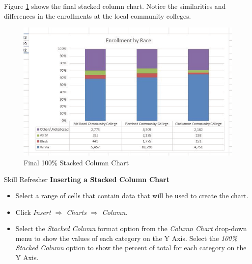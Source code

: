 Figure \ref{04:fig27} shows the final stacked column chart. Notice the similarities and differences in the enrollments at the local community colleges.

\begin{figure}[H]
	\centering
	\includegraphics[width=\maxwidth{.95\linewidth}]{gfx/ch04_fig27}
	\caption{Final 100\% Stacked Column Chart}
	\label{04:fig27}
\end{figure}

\begin{center}
	\begin{sklbox}{Skill Refresher}
		\textbf{Inserting a Stacked Column Chart}
		\\
		\begin{itemize}
			\setlength{\itemsep}{0pt}
			\setlength{\parskip}{0pt}
			\setlength{\parsep}{0pt}

			\item Select a range of cells that contain data that will be used to create the chart.
			\item Click \textit{Insert $ \Rightarrow $ Charts $ \Rightarrow $ Column}.
			\item Select the \textit{Stacked Column} format option from the \textit{Column Chart} drop-down menu to show the values of each category on the Y Axis. Select the \textit{100\% Stacked Column} option to show the percent of total for each category on the Y Axis.
			
		\end{itemize}
	\end{sklbox}
\end{center}

